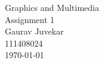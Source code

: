\begin{titlepage}
\begin{center}
  {Graphics and Multimedia \\}
  \LARGE{Assignment 1 \\}
  \horrule{0.4pt}
  \large{Gaurav Juvekar \\}
  \large{111408024 \\}
  \normalsize{\today{}}
\end{center}
\horrule{1pt}
\end{titlepage}
